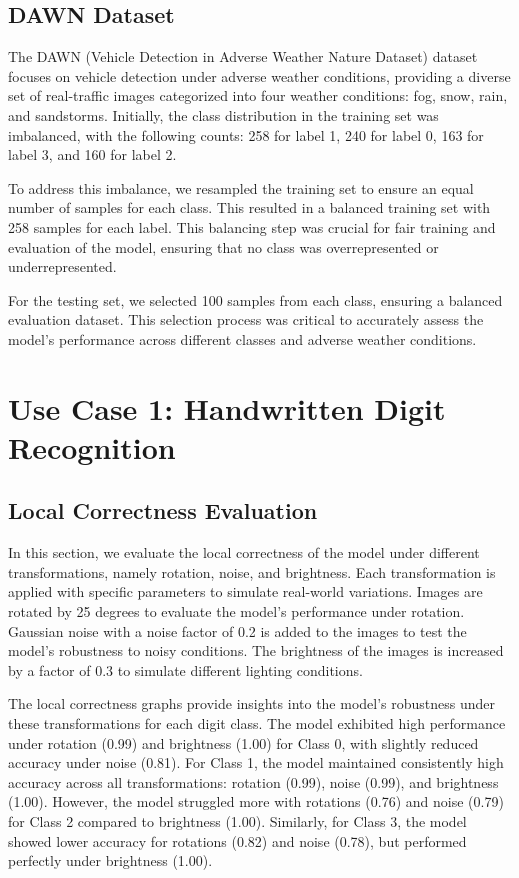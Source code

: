 \subsection{DAWN Dataset}

The DAWN (Vehicle Detection in Adverse Weather Nature Dataset) dataset focuses on vehicle detection under adverse weather conditions, providing a diverse set of real-traffic images categorized into four weather conditions: fog, snow, rain, and sandstorms. Initially, the class distribution in the training set was imbalanced, with the following counts: 258 for label 1, 240 for label 0, 163 for label 3, and 160 for label 2.

To address this imbalance, we resampled the training set to ensure an equal number of samples for each class. This resulted in a balanced training set with 258 samples for each label. This balancing step was crucial for fair training and evaluation of the model, ensuring that no class was overrepresented or underrepresented.

For the testing set, we selected 100 samples from each class, ensuring a balanced evaluation dataset. This selection process was critical to accurately assess the model's performance across different classes and adverse weather conditions.




\section{Use Case 1: Handwritten Digit Recognition }
\subsection{Local Correctness Evaluation}

In this section, we evaluate the local correctness of the model under different transformations, namely rotation, noise, and brightness. Each transformation is applied with specific parameters to simulate real-world variations. Images are rotated by 25 degrees to evaluate the model's performance under rotation. Gaussian noise with a noise factor of 0.2 is added to the images to test the model's robustness to noisy conditions. The brightness of the images is increased by a factor of 0.3 to simulate different lighting conditions.

The local correctness graphs provide insights into the model's robustness under these transformations for each digit class. The model exhibited high performance under rotation (0.99) and brightness (1.00) for Class 0, with slightly reduced accuracy under noise (0.81). For Class 1, the model maintained consistently high accuracy across all transformations: rotation (0.99), noise (0.99), and brightness (1.00). However, the model struggled more with rotations (0.76) and noise (0.79) for Class 2 compared to brightness (1.00). Similarly, for Class 3, the model showed lower accuracy for rotations (0.82) and noise (0.78), but performed perfectly under brightness (1.00). 

